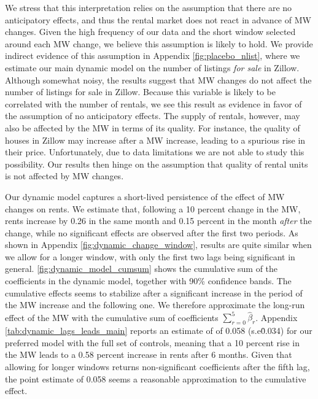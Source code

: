 We stress that this interpretation relies on the assumption that there are no anticipatory
effects, and thus the rental market does not react in advance of MW changes. Given the high 
frequency of our data and the short window selected around each MW change, we believe this 
assumption is likely to hold. We provide indirect evidence of this assumption in Appendix 
\autoref{fig:placebo_nlist}, where we estimate our main dynamic model on the number of listings 
\textit{for sale} in Zillow. Although somewhat noisy, the results suggest that MW changes do 
not affect the number of listings for sale in Zillow. Because this variable is likely to be 
correlated with the number of rentals, we see this result as evidence in favor of the 
assumption of no anticipatory effects. The supply of rentals, however, may also be affected 
by the MW in terms of its quality. For instance, the quality of houses in Zillow may increase 
after a MW increase, leading to a spurious rise in their price. Unfortunately, due to data 
limitations we are not able to study this possibility. Our results then hinge on the assumption 
that quality of rental units is not affected by MW changes.

Our dynamic model captures a short-lived persistence of the effect of MW changes on rents. We 
estimate that, following a 10 percent change in the MW, rents increase by 0.26 in the same month 
and 0.15 percent in the month \textit{after} the change, while no significant effects are 
observed after the first two periods. As shown in Appendix \autoref{fig:dynamic_change_window}, 
results are quite similar when we allow for a longer window, with only the first two lags being 
significant in general.
\autoref{fig:dynamic_model_cumsum} shows the cumulative sum of the coefficients in the dynamic 
model, together with 90\% confidence bands. The cumulative effects seems to stabilize after a 
significant increase in the period of the MW increase and the following one. We therefore 
approximate the long-run effect of the MW with the cumulative sum of coefficients 
$\sum_{r=0}^{5} \hat{\beta}_{r}$. Appendix \autoref{tab:dynamic_lags_leads_main} reports an 
estimate of of 0.058 (s.e\. 0.034) for our preferred model with the full set of controls, 
meaning that a 10 percent rise in the MW leads to a 0.58 percent increase in rents after 6 
months. Given that allowing for longer windows returns non-significant coefficients after the 
fifth lag, the point estimate of 0.058 seems a reasonable approximation to the cumulative effect.

